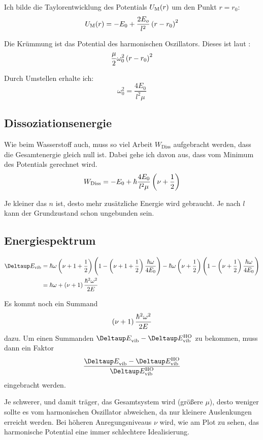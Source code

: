 Ich bilde die Taylorentwicklung des Potentials $U_\text M(r)$ um den Punkt $r =
r_0$:
\[
	U_\text M(r) = - E_0 + \frac{2E_o}{l^2} \del{r-r_0}^2
\]

Die Krümmung ist das Potential des harmonischen Oszillators. Dieses ist laut
\cite[Folie 12]{kubis/physik421}:
\[
	\frac \mu2 \omega_0^2 \del{r-r_0}^2
\]

Durch Umstellen erhalte ich:
\[
	\omega_0^2 = \frac{4E_0}{l^2\mu}
\]

\subsection{Dissoziationsenergie}

Wie beim Wasserstoff auch, muss so viel Arbeit $W_\text{Diss}$ aufgebracht
werden, dass die Gesamtenergie gleich null ist. Dabei gehe ich davon aus, dass
vom Minimum des Potentials gerechnet wird.
\[
	W_\text{Diss} = - E_0 + \hbar \frac{4E_0}{l^2\mu} \del{\nu + \half}
\]

Je kleiner das $n$ ist, desto mehr zusätzliche Energie wird gebraucht. Je nach
$l$ kann der Grundzustand schon ungebunden sein.

\subsection{Energiespektrum}

\begin{align*}
	\Deltaup E_\text{vib}
	&= \hbar \omega \del{\nu + 1 + \half} \del{1 - \del{\nu + 1 + \half} \frac{\hbar \omega}{4 E_0}} -
	\hbar \omega \del{\nu + \half} \del{1 - \del{\nu + \half} \frac{\hbar \omega}{4 E_0}} \\
	&= \hbar \omega + \del{\nu + 1} \frac{\hbar^2 \omega^2}{2 E}
\end{align*}

Es kommt noch ein Summand 
\[
	\del{\nu + 1} \frac{\hbar^2 \omega^2}{2 E}
\]
dazu. Um einen Summanden $\Deltaup E_\text{vib}^{} - \Deltaup E_\text{vib}^\text{HO}$ zu bekommen, muss dann ein Faktor
\[
	\frac{\Deltaup E_\text{vib}^{} - \Deltaup E_\text{vib}^\text{HO}}{\Deltaup E_\text{vib}^\text{HO}}
\]
eingebracht werden.

Je schwerer, und damit träger, das Gesamtsystem wird (größere $\mu$), desto
weniger sollte es vom harmonischen Oszillator abweichen, da nur kleinere
Auslenkungen erreicht werden. Bei höheren Anregungsniveaus $\nu$ wird, wie am
Plot zu sehen, das harmonische Potential eine immer schlechtere Idealisierung.

